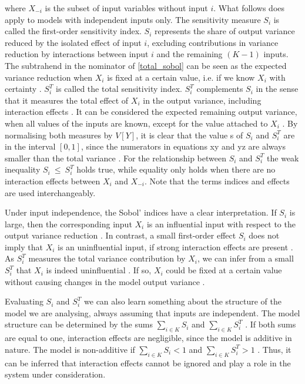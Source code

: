 \noindent where $X_{- i}$ is the subset of input variables without input $i$. What follows does apply to models with independent inputs only. The sensitivity measure $S_i$ is called the first-order sensitivity index. $S_i$ represents the share of output variance reduced by the isolated effect of input $i$, excluding contributions in variance reduction by interactions between input $i$ and the remaining $(K-1)$ inputs. The subtrahend in the nominator of \cref{total_sobol} can be seen as the expected variance reduction when $X_i$ is fixed at a certain value, i.e. if we know $X_i$ with certainty \citep{SNS16}. $S_i^T$ is called the total sensitivity index. $S_i^T$ complements $S_i$ in the sense that it measures the total effect of $X_i$ in the output variance, including interaction effects \citep{SNS16}. It can be considered the expected remaining output variance, when all values of the inputs are known, except for the value attached to $X_i$ \citep{SNS16}. By normalising both measures by $V[Y]$, it is clear that the value s of $S_i$ and $S_i^T$ are in the interval $[0, 1]$, since the numerators in equations xy and yz are always smaller than the total variance \citep{GM17}. For the relationship between $S_i$ and $S_i^T$ the weak inequality $S_i\ \le\ S_i^T$ holds true, while equality only holds when there are no interaction effects between $X_i$ and $X_{- i}$. Note that the terms indices and effects are used interchangeably.

Under input independence, the Sobol' indices have a clear interpretation. If $S_i$ is large, then the corresponding input $X_i$ is an influential input with respect to the output variance reduction \citep{GM17}. In contrast, a small first-order effect $S_i$ does not imply that $X_i$ is an uninfluential input, if strong interaction effects are present \citep{GM17}. As $S_i^T$ measures the total variance contribution by $X_i$, we can infer from a small $S_i^T$ that $X_i$ is indeed uninfluential \citep{GM17}. If so, $X_i$ could be fixed at a certain value without causing changes in the model output variance \citep{GM17}.

Evaluating $S_i$ and $S_i^T$ we can also learn something about the structure of the model we are analysing, always assuming that inputs are independent. The model structure can be determined by the sums $\sum_{i \in K} S_i$ and $\sum_{i \in K} S_i^T$ \citep{GM17}. If both sums are equal to one, interaction effects are negligible, since the model is additive in nature. The model is non-additive if $\sum_{i \in K} S_i < 1$ and $\sum_{i \in K} S_i^T > 1$ \citep{GM17}. Thus, it can be inferred that interaction effects cannot be ignored and play a role in the system under consideration.


